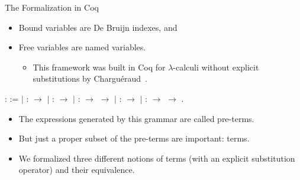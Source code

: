 \documentclass[10pt]{beamer}
\begin{document}
\begin{frame}[fragile]{The Formalization in Coq}

    \begin{itemize}
    \item Bound variables are De Bruijn indexes, and
    \item Free variables are named variables.
      \begin{itemize}
      \item This framework was built in Coq for $\lambda$-calculi
        without explicit substitutions by Charguéraud~\cite{Ch11}.
      \end{itemize}
    \end{itemize}

  \begin{coqdoccode}
    \coqdocnoindent {}  :
     :=\coqdoceol \coqdocindent{1.00em} \ensuremath{|}
     :  \ensuremath{\rightarrow}
    \coqdoceol \coqdocindent{1.00em} \ensuremath{|}
     :  \ensuremath{\rightarrow}
    \coqdoceol \coqdocindent{1.00em} \ensuremath{|}
     : 
    \ensuremath{\rightarrow} 
    \ensuremath{\rightarrow} \coqdoceol
    \coqdocindent{1.00em} \ensuremath{|}  :
     \ensuremath{\rightarrow}
    \coqdoceol \coqdocindent{1.00em} \ensuremath{|}
     : 
    \ensuremath{\rightarrow} 
    \ensuremath{\rightarrow} .\coqdoceol
  \end{coqdoccode}

  \begin{itemize}
  \item The expressions generated by this grammar are called pre-terms.
  \item But just a proper subset of the pre-terms are important: terms.
  \item We formalized three different notions of terms (with an
    explicit substitution operator) and their equivalence.
  \end{itemize}

\end{frame}
\end{document}
